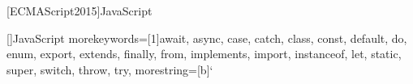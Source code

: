 [ECMAScript2015]{JavaScript}

[]{JavaScript}{
  morekeywords=[1]{await, async, case, catch, class, const, default, do,
    enum, export, extends, finally, from, implements, import, instanceof,
    let, static, super, switch, throw, try},
  morestring=[b]` %
}